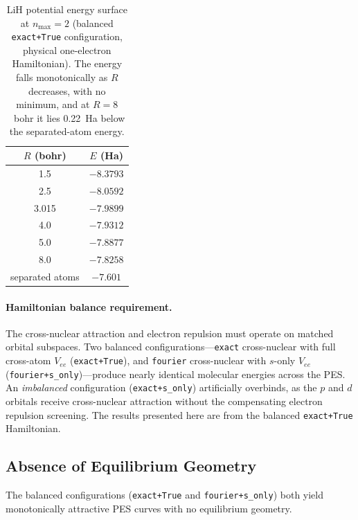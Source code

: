 \documentclass[aps,pra,twocolumn,superscriptaddress,longbibliography]{revtex4-2}
\begin{document}
\begin{table}[h]
\centering
\begin{tabular}{cc}
\toprule
$R$ (bohr) & $E$ (Ha) \\
\midrule
1.5 & $-8.3793$ \\
2.5 & $-8.0592$ \\
3.015 & $-7.9899$ \\
4.0 & $-7.9312$ \\
5.0 & $-7.8877$ \\
8.0 & $-7.8258$ \\
\midrule
separated atoms & $-7.601$ \\
\bottomrule
\end{tabular}
\caption{LiH potential energy surface at $n_{\max}=2$ (balanced
\texttt{exact+True} configuration, physical one-electron Hamiltonian).
The energy falls monotonically as $R$ decreases, with no minimum, and at
$R=8$~bohr it lies 0.22~Ha below the separated-atom energy.}
\label{tab:lih_energies}
\end{table}

\paragraph{Hamiltonian balance requirement.}
The cross-nuclear attraction and electron repulsion must operate on
matched orbital subspaces.  Two balanced configurations---\texttt{exact}
cross-nuclear with full cross-atom $V_{ee}$ (\texttt{exact+True}), and
\texttt{fourier} cross-nuclear with $s$-only $V_{ee}$
(\texttt{fourier+s\_only})---produce nearly identical molecular energies
across the PES.  An \emph{imbalanced} configuration
(\texttt{exact+s\_only}) artificially overbinds, as the $p$ and $d$
orbitals receive cross-nuclear attraction without the compensating
electron repulsion screening.  The results presented here are from the
balanced \texttt{exact+True} Hamiltonian.

\subsection{Absence of Equilibrium Geometry}
\label{sec:contraction}

The balanced configurations (\texttt{exact+True} and
\texttt{fourier+s\_only}) both yield monotonically attractive PES curves
with no equilibrium geometry.
\end{document}
